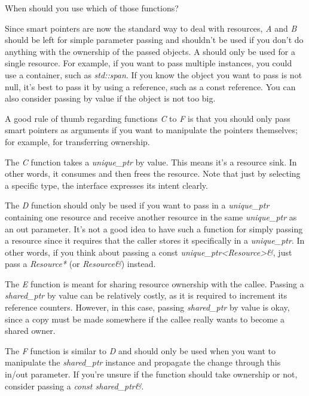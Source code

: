When should you use which of those functions?

Since smart pointers are now the standard way to deal with resources, \textit{A} and \textit{B} should be left for simple parameter passing and shouldn't be used if you don't do anything with the ownership of the passed objects. A should only be used for a single resource. For example, if you want to pass multiple instances, you could use a container, such as \textit{std::span}. If you know the object you want to pass is not null, it's best to pass it by using a reference, such as a const reference. You can also consider passing by value if the object is not too big.

A good rule of thumb regarding functions \textit{C} to \textit{F} is that you should only pass smart pointers as arguments if you want to manipulate the pointers themselves; for example, for transferring ownership.

The \textit{C} function takes a \textit{unique\_ptr} by value. This means it's a resource sink. In other words, it consumes and then frees the resource. Note that just by selecting a specific type, the interface expresses its intent clearly.

The \textit{D} function should only be used if you want to pass in a \textit{unique\_ptr} containing one resource and receive another resource in the same \textit{unique\_ptr} as an out parameter. It's not a good idea to have such a function for simply passing a resource since it requires that the caller stores it specifically in a \textit{unique\_ptr}. In other words, if you think about passing a const \textit{unique\_ptr<Resource>\&}, just pass a \textit{Resource*} (or \textit{Resource\&}) instead.

The \textit{E} function is meant for sharing resource ownership with the callee. Passing a \textit{shared\_ptr} by value can be relatively costly, as it is required to increment its reference counters. However, in this case, passing \textit{shared\_ptr} by value is okay, since a copy must be made somewhere if the callee really wants to become a shared owner.

The \textit{F} function is similar to \textit{D} and should only be used when you want to manipulate the \textit{shared\_ptr} instance and propagate the change through this in/out parameter. If you're unsure if the function should take ownership or not, consider passing a \textit{const shared\_ptr\&}.


